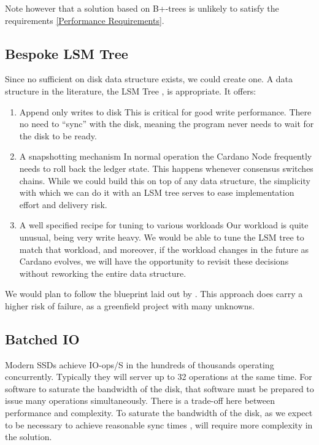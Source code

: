 \documentclass[11pt,a4paper]{article}
\begin{document}
Note however that a solution based on B+-trees is unlikely to satisfy the requirements \ref{Performance Requirements}.

\subsection{Bespoke LSM Tree}

Since no sufficient on disk data structure exists, we could create one. A data
structure in the literature, the LSM Tree \cite{monkey}, is appropriate. It offers:

\begin{enumerate}
  \item Append only writes to disk
        This is critical for good write performance. There no need to ``sync''
        with the disk, meaning the program never needs to wait for the disk to be ready.
  \item A snapshotting mechanism
        In normal operation the Cardano Node frequently needs to roll back the
        ledger state. This happens whenever consensus switches chains. While we could
        build this on top of any data structure, the simplicity with which we can do it
        with an LSM tree serves to ease implementation effort and delivery risk.
  \item A well specified recipe for tuning to various workloads
        Our workload is quite unusual, being very write heavy. We would be able
        to tune the LSM tree to match that workload, and moreover, if the workload
        changes in the future as Cardano evolves, we will have the opportunity to
        revisit these decisions without reworking the entire data structure.
\end{enumerate}

We would plan to follow the blueprint laid out by \cite{monkey}. This approach
does carry a higher risk of failure, as a greenfield project with many unknowns.

\subsection{Batched IO}
\label{Batched IO}
Modern SSDs achieve IO-ops/S in the hundreds of thousands operating concurrently.
Typically they will server up to 32 operations at the same time. For software to
saturate the bandwidth of the disk, that software must be prepared to issue many
operations simultaneously. There is a trade-off here between performance and
complexity. To saturate the bandwidth of the disk, as we expect to be necessary
to achieve reasonable sync times , will require more complexity in
the solution.
\end{document}
